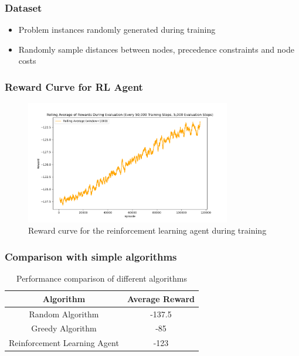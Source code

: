 \documentclass{beamer}
\begin{document}
\begin{frame}
    \frametitle{Dataset}
    \begin{itemize}
        \item Problem instances randomly generated during training
        \item Randomly sample distances between nodes, precedence constraints and node costs
    \end{itemize}
\end{frame}


\begin{frame}
    \frametitle{Reward Curve for RL Agent}
    \begin{figure}
        \centering
        \includegraphics[width=0.8\textwidth]{reward_trajectory.png}
        \caption{Reward curve for the reinforcement learning agent during training}
    \end{figure}
\end{frame}

\begin{frame}
    \frametitle{Comparison with simple algorithms}
    \begin{table}[]
        \centering
        \begin{tabular}{|c|c|}
            \hline
            \textbf{Algorithm} & \textbf{Average Reward} \\
            \hline
            Random Algorithm & -137.5 \\  %
            \hline
            Greedy Algorithm & -85 \\
            \hline
            Reinforcement Learning Agent & -123 \\
            \hline
        \end{tabular}
        \caption{Performance comparison of different algorithms}
    \end{table}
\end{frame}
\end{document}
